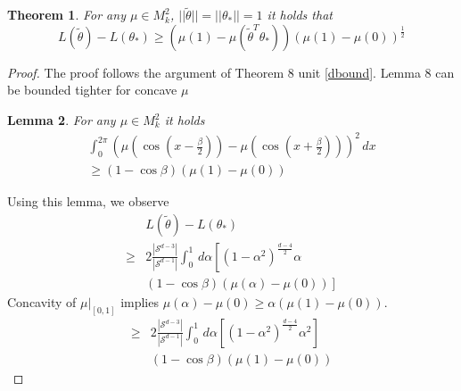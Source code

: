 \documentclass[twoside]{article} \usepackage{aistats2017}
\newtheorem{theorem}{Theorem}
\newtheorem{lemma}[theorem]{Lemma}
\begin{document}
\begin{theorem}
For any $\mu \in M_k^2$, $||\tilde{\theta}||=||\theta_*||=1$ it holds that
$$L(\tilde{\theta})-L(\theta_*) \geq (\mu(1)-\mu(\tilde{\theta}^T\theta_*) )(\mu(1)-\mu(0))^{\frac{1}{2}}$$
\end{theorem}
\begin{proof}
The proof follows the argument of Theorem 8 unit \ref{dbound}. Lemma 8 can be bounded tighter for concave $\mu$
\begin{lemma}\label{concavebound}
    For any $\mu\in M_k^2$ it holds
\begin{align*}
            \int_{0}^{2\pi}\left(\mu(\cos(x-\frac{\beta}{2}))-\mu( \cos(x+\frac{\beta}{2}))\right)^2\, dx\\
            \geq (1-\cos{\beta})(\mu(1)-\mu(0))
\end{align*}
\end{lemma}
Using this lemma, we observe
\begin{align*}
    &L(\tilde{\theta})-L(\theta_*)\\
    \geq&2\frac{|\mathcal{S}^{d-3}|}{|\mathcal{S}^{d-1}|}\int_{0}^{1}\,d\alpha\left[(1-\alpha^2)^{\frac{d-4}{2}}\alpha\right.\\
    &\left.(1-\cos{\beta})(\mu(\alpha)-\mu(0))\right]
\end{align*}
Concavity of $\mu|_{[0,1]}$ implies $\mu(\alpha)-\mu(0)\geq \alpha(\mu(1)-\mu(0))$.
\begin{align*}
    \geq&2\frac{|\mathcal{S}^{d-3}|}{|\mathcal{S}^{d-1}|}\int_{0}^{1}\,d\alpha\left[(1-\alpha^2)^{\frac{d-4}{2}}\alpha^{2}\right]\\
    &(1-\cos{\beta})(\mu(1)-\mu(0))
\end{align*}
\end{proof}
\end{document}
